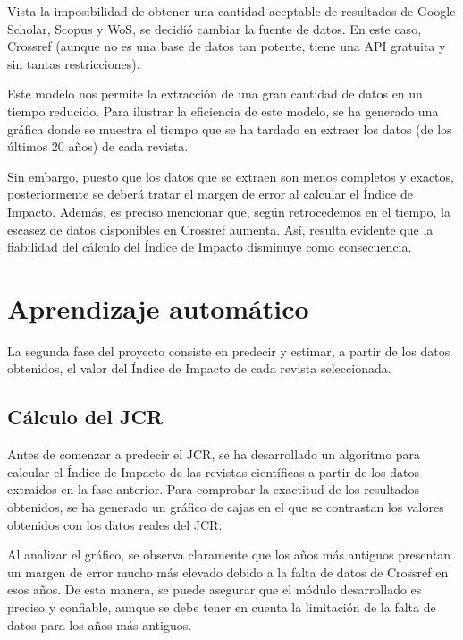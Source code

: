 Vista la imposibilidad de obtener una cantidad aceptable de resultados de Google Scholar, Scopus y WoS, se decidió cambiar la fuente de datos. En este caso, Crossref (aunque no es una base de datos tan potente, tiene una API gratuita y sin tantas restricciones).

Este modelo nos permite la extracción de una gran cantidad de datos en un tiempo reducido. Para ilustrar la eficiencia de este modelo, se ha generado una gráfica donde se muestra el tiempo que se ha tardado en extraer los datos (de los últimos 20 años) de cada revista.


Sin embargo, puesto que los datos que se extraen son menos completos y exactos, posteriormente se deberá tratar el margen de error al calcular el Índice de Impacto. Además, es preciso mencionar que, según retrocedemos en el tiempo, la escasez de datos disponibles en Crossref aumenta. Así, resulta evidente que la fiabilidad del cálculo del Índice de Impacto disminuye como consecuencia.

\section{Aprendizaje automático}
La segunda fase del proyecto consiste en predecir y estimar, a partir de los datos obtenidos, el valor del Índice de Impacto de cada revista seleccionada.

\subsection{Cálculo del JCR}
Antes de comenzar a predecir el JCR, se ha desarrollado un algoritmo para calcular el Índice de Impacto de las revistas científicas a partir de los datos extraídos en la fase anterior. Para comprobar la exactitud de los resultados obtenidos, se ha generado un gráfico de cajas en el que se contrastan los valores obtenidos con los datos reales del JCR. 

%


Al analizar el gráfico, se observa claramente que los años más antiguos presentan un margen de error mucho más elevado debido a la falta de datos de Crossref en esos años. De esta manera, se puede asegurar que el módulo desarrollado es preciso y confiable, aunque se debe tener en cuenta la limitación de la falta de datos para los años más antiguos.

